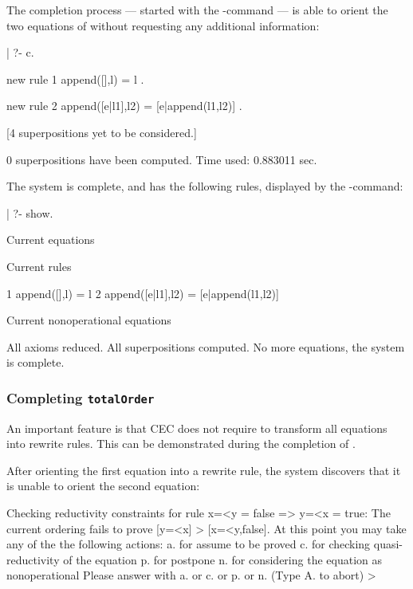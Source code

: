 The completion process --- started with the -command ---
is able to orient the two equations of 
without requesting any additional information:

\begin{screen}
| ?- c.

new rule   1    append([],l) = l .

new rule   2    append([e|l1],l2) = [e|append(l1,l2)] .

[4 superpositions yet to be considered.]

0 superpositions have been computed.
Time used: 0.883011 sec.
\end{screen}

\noindent
The system is complete, and has the following rules, displayed 
by the -command:

\begin{screen}
| ?- show.

Current equations

Current rules

  1    append([],l) = l
  2    append([e|l1],l2) = [e|append(l1,l2)]

Current nonoperational equations

All axioms reduced.
All superpositions computed.
No more equations, the system is complete.
\end{screen}


\subsubsection{Completing {\tt totalOrder}}

An important feature is that CEC does not require to transform all
equations into rewrite rules. This can be demonstrated during the
completion of .

After orienting the first equation into a rewrite rule, 
the system discovers that it is unable to orient the second 
equation:

\begin{screen}
Checking reductivity constraints for rule
        x=<y = false => y=<x = true:
The current ordering fails to prove
[y=<x]  >  [x=<y,false].
At this point you may take any of the the following actions:
a. for assume to be proved
c. for checking quasi-reductivity of the equation
p. for postpone
n. for considering the equation as nonoperational
   Please answer with a. or c. or p. or n. (Type A. to abort) > 
\end{screen}

